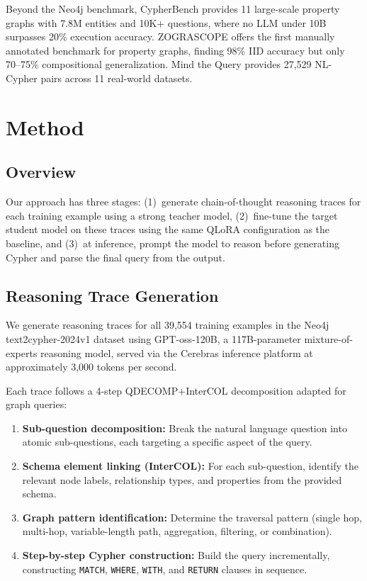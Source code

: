 \documentclass[11pt]{article}
\begin{document}
Beyond the Neo4j benchmark, CypherBench \citep{cypherbench2025} provides 11 large-scale property graphs with 7.8M entities and 10K+ questions, where no LLM under 10B surpasses 20\% execution accuracy. ZOGRASCOPE \citep{zograscope2025} offers the first manually annotated benchmark for property graphs, finding 98\% IID accuracy but only 70--75\% compositional generalization. Mind the Query \citep{mindthequery2025} provides 27,529 NL-Cypher pairs across 11 real-world datasets.

\section{Method}

\subsection{Overview}

Our approach has three stages: (1)~generate chain-of-thought reasoning traces for each training example using a strong teacher model, (2)~fine-tune the target student model on these traces using the same QLoRA configuration as the baseline, and (3)~at inference, prompt the model to reason before generating Cypher and parse the final query from the output.

\subsection{Reasoning Trace Generation}

We generate reasoning traces for all 39,554 training examples in the Neo4j text2cypher-2024v1 dataset using GPT-oss-120B, a 117B-parameter mixture-of-experts reasoning model, served via the Cerebras inference platform at approximately 3,000 tokens per second.

Each trace follows a 4-step QDECOMP+InterCOL decomposition adapted for graph queries:
\begin{enumerate}
    \item \textbf{Sub-question decomposition:} Break the natural language question into atomic sub-questions, each targeting a specific aspect of the query.
    \item \textbf{Schema element linking (InterCOL):} For each sub-question, identify the relevant node labels, relationship types, and properties from the provided schema.
    \item \textbf{Graph pattern identification:} Determine the traversal pattern (single hop, multi-hop, variable-length path, aggregation, filtering, or combination).
    \item \textbf{Step-by-step Cypher construction:} Build the query incrementally, constructing \texttt{MATCH}, \texttt{WHERE}, \texttt{WITH}, and \texttt{RETURN} clauses in sequence.
\end{enumerate}
\end{document}
